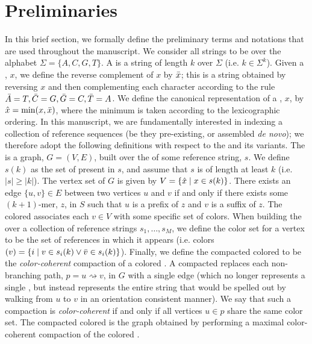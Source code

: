 \section{Preliminaries}\label{sec:prelim}
In this brief section, we formally define the preliminary terms and notations
that are used throughout the manuscript. We consider all strings to be over the
alphabet $\Sigma = \{A,C,G,T\}$. A \kmer is a string of length $k$ over $\Sigma$
(i.e. $k \in \Sigma^k$). Given a \kmer, $x$, we define the reverse complement of
$x$ by $\bar{x}$; this is a string obtained by reversing $x$ and then
complementing each character according to the rule $\bar{A} = T, \bar{C} = G,
\bar{G} = C, \bar{T} = A$. We define the canonical representation of a \kmer, $x$,
by $\hat{x} = \min(x, \bar{x})$, where the minimum is taken according to the
lexicographic ordering. In this manuscript, we are fundamentally interested in
indexing a collection of reference sequences (be they pre-existing, or assembled
\emph{de novo}); we therefore adopt the following definitions with respect to
the \dbg and its variants. The \dbg is a graph, $G = (V, E)$, built over the
\kmers of some reference string, $s$. We define $s(k)$ as the set of \kmers
present in $s$, and assume that $s$ is of length at least $k$ (i.e.
$\left|s\right| \ge \left|k\right|$). The vertex set of $G$ is given by $V =
\{\hat{x} \mid x \in s(k)\}$. There exists an edge $\{u,v\} \in E$ between two
vertices $u$ and $v$ if and only if there exists some $(k+1)$-mer, $z$, in $S$
such that $u$ is a prefix of $z$ and $v$ is a suffix of $z$. The colored \dbg
associates each $v \in V$ with some specific set of colors. When building the
\dbg over a collection of reference strings $s_1, \dots, s_M$, we define the
color set for a vertex to be the set of references in which it appears (i.e.
colors$(v) = \{i \mid v \in s_i(k) \lor \bar{v} \in s_i(k)\}$). Finally, we define
the compacted colored \dbg to be the \emph{color-coherent} compaction of a
colored \dbg. A compacted \dbg replaces each non-branching path, $p = u
\rightsquigarrow v$, in $G$ with a single edge (which no longer represents a
single \kmer, but instead represents the entire string that would be spelled out
by walking from $u$ to $v$ in an orientation consistent manner). We say that
such a compaction is \emph{color-coherent} if and only if all vertices $u \in p$
share the same color set. The compacted colored \dbg is the graph obtained by
performing a maximal color-coherent compaction of the colored \dbg.


